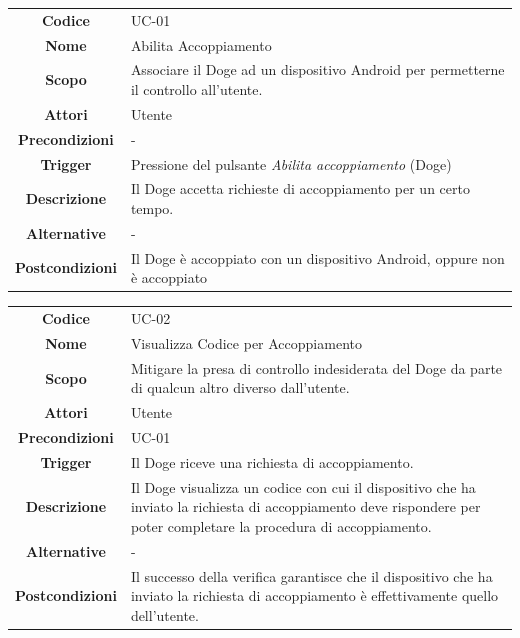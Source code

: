 \documentclass{article}
\begin{document}
\pagebreak

\begin{adjustbox}{center}
\begin{tabular}{|c|p{10cm}|}
\hline
\textbf{Codice} & UC-01 \\
\textbf{Nome} & Abilita Accoppiamento \\
\textbf{Scopo} & Associare il Doge ad un dispositivo Android per permetterne il controllo all'utente. \\
\textbf{Attori} & Utente \\
\textbf{Precondizioni} & - \\
\textbf{Trigger} & Pressione del pulsante \emph{Abilita accoppiamento} (Doge) \\
\textbf{Descrizione} & Il Doge accetta richieste di accoppiamento per un certo tempo. \\
\textbf{Alternative} & - \\
\textbf{Postcondizioni} & Il Doge è accoppiato con un dispositivo Android, oppure non è accoppiato \\
\hline
\end{tabular}
\end{adjustbox}

\begin{adjustbox}{center}
\begin{tabular}{|c|p{10cm}|}
\hline
\textbf{Codice} & UC-02 \\
\textbf{Nome} & Visualizza Codice per Accoppiamento \\
\textbf{Scopo} & Mitigare la presa di controllo indesiderata del Doge da parte di qualcun altro diverso dall'utente. \\
\textbf{Attori} & Utente \\
\textbf{Precondizioni} & UC-01 \\
\textbf{Trigger} & Il Doge riceve una richiesta di accoppiamento. \\
\textbf{Descrizione} & Il Doge visualizza un codice con cui il dispositivo che ha inviato la richiesta di accoppiamento deve rispondere per poter completare la
procedura di accoppiamento. \\
\textbf{Alternative} & - \\
\textbf{Postcondizioni} & Il successo della verifica garantisce che il dispositivo che ha inviato la richiesta di accoppiamento è effettivamente quello dell'utente. \\
\hline
\end{tabular}
\end{adjustbox}
\end{document}

